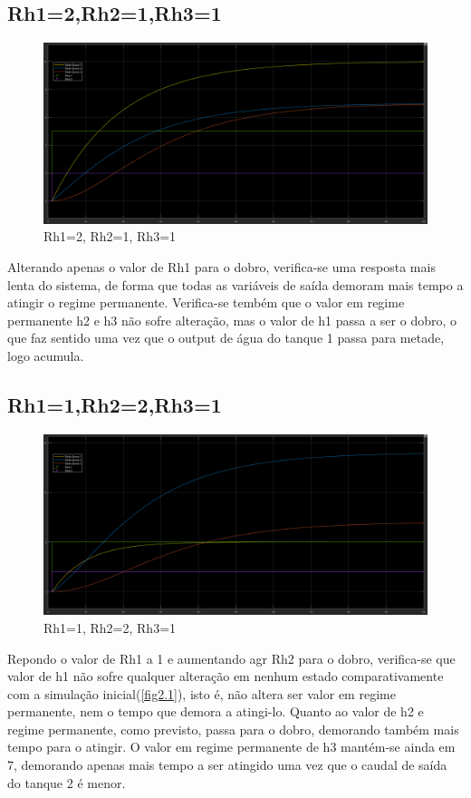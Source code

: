 \documentclass[11pt]{article}
\begin{document}
\subsection{Rh1=2,Rh2=1,Rh3=1}
\begin{figure}[!h]
\includegraphics[width=16cm]{rh1.png}
\caption{Rh1=2, Rh2=1, Rh3=1}
\label{fig2.2}
\end{figure}
Alterando apenas o valor de Rh1 para o dobro, verifica-se uma resposta mais lenta do sistema, de forma que todas as variáveis de saída demoram mais tempo a atingir o regime permanente. Verifica-se tembém que o valor em regime permanente h2 e h3 não sofre alteração, mas o valor de h1 passa a ser o dobro, o que faz sentido uma vez que o output de água do tanque 1 passa para metade, logo acumula.
\pagebreak
\subsection{Rh1=1,Rh2=2,Rh3=1}
\begin{figure}[!h]
\includegraphics[width=16cm]{rh2.png}
\caption{Rh1=1, Rh2=2, Rh3=1}
\label{fig2.3}
\end{figure}
Repondo o valor de Rh1 a 1 e aumentando agr Rh2 para o dobro, verifica-se que valor de h1 não sofre qualquer alteração em nenhum estado comparativamente com a simulação inicial(\ref{fig2.1}), isto é, não altera ser valor em regime permanente, nem o tempo que demora a atingi-lo. Quanto ao valor de h2 e regime permanente, como previsto, passa para o dobro, demorando também mais tempo para o atingir. O valor em regime permanente de h3 mantém-se ainda em 7, demorando apenas mais tempo a ser atingido uma vez que o caudal de saída do tanque 2 é menor. 
\end{document}
